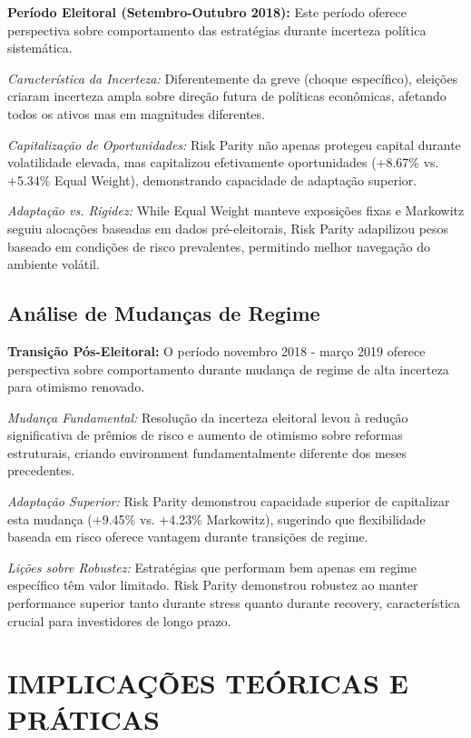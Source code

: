 \textbf{Período Eleitoral (Setembro-Outubro 2018):} Este período oferece perspectiva sobre comportamento das estratégias durante incerteza política sistemática.

\textit{Característica da Incerteza:} Diferentemente da greve (choque específico), eleições criaram incerteza ampla sobre direção futura de políticas econômicas, afetando todos os ativos mas em magnitudes diferentes.

\textit{Capitalização de Oportunidades:} Risk Parity não apenas protegeu capital durante volatilidade elevada, mas capitalizou efetivamente oportunidades (+8.67\% vs. +5.34\% Equal Weight), demonstrando capacidade de adaptação superior.

\textit{Adaptação vs. Rigidez:} While Equal Weight manteve exposições fixas e Markowitz seguiu alocações baseadas em dados pré-eleitorais, Risk Parity adapilizou pesos baseado em condições de risco prevalentes, permitindo melhor navegação do ambiente volátil.

\subsection{Análise de Mudanças de Regime}

\textbf{Transição Pós-Eleitoral:} O período novembro 2018 - março 2019 oferece perspectiva sobre comportamento durante mudança de regime de alta incerteza para otimismo renovado.

\textit{Mudança Fundamental:} Resolução da incerteza eleitoral levou à redução significativa de prêmios de risco e aumento de otimismo sobre reformas estruturais, criando environment fundamentalmente diferente dos meses precedentes.

\textit{Adaptação Superior:} Risk Parity demonstrou capacidade superior de capitalizar esta mudança (+9.45\% vs. +4.23\% Markowitz), sugerindo que flexibilidade baseada em risco oferece vantagem durante transições de regime.

\textit{Lições sobre Robustez:} Estratégias que performam bem apenas em regime específico têm valor limitado. Risk Parity demonstrou robustez ao manter performance superior tanto durante stress quanto durante recovery, característica crucial para investidores de longo prazo.

\section{IMPLICAÇÕES TEÓRICAS E PRÁTICAS}

